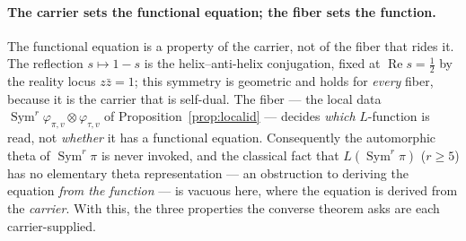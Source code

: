 \documentclass[11pt]{article}
\theoremstyle{definition}
\renewcommand{\Re}{\operatorname{Re}}
\newcommand{\Sym}{\operatorname{Sym}}
\begin{document}
\paragraph{The carrier sets the functional equation; the fiber sets the function.} The functional
equation is a property of the carrier, not of the fiber that rides it. The reflection $s\mapsto1-s$ is
the helix--anti-helix conjugation, fixed at $\Re s=\tfrac12$ by the reality locus $z\bar z=1$; this
symmetry is geometric and holds for \emph{every} fiber, because it is the carrier that is self-dual. The
fiber --- the local data $\Sym^r\varphi_{\pi,v}\otimes\varphi_{\tau,v}$ of
Proposition~\ref{prop:localid} --- decides \emph{which} $L$-function is read, not \emph{whether} it has a
functional equation. Consequently the automorphic theta of $\Sym^r\pi$ is never invoked, and the
classical fact that $L(\Sym^r\pi)$ ($r\ge5$) has no elementary theta representation --- an obstruction to
deriving the equation \emph{from the function} --- is vacuous here, where the equation is derived from
the \emph{carrier}. With this, the three properties the converse theorem asks are each carrier-supplied.
\end{document}
